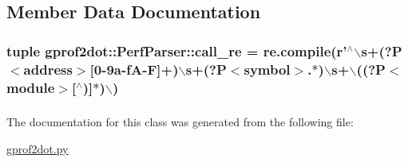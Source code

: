 \subsection{Member Data Documentation}
\hypertarget{classgprof2dot_1_1PerfParser_a4d233c4bf5eade9c8e39234afe4a0ff2}{
\subsubsection[{call\_\-re}]{\setlength{\rightskip}{0pt plus 5cm}tuple {\bf gprof2dot::PerfParser::call\_\-re} = re.compile(r'$^\wedge$$\backslash$s+(?P$<$address$>$\mbox{[}0-\/9a-\/fA-\/F\mbox{]}+)$\backslash$s+(?P$<$symbol$>$.$\ast$)$\backslash$s+$\backslash$((?P$<$module$>$\mbox{[}$^\wedge$)\mbox{]}$\ast$)$\backslash$)}}
\label{classgprof2dot_1_1PerfParser_a4d233c4bf5eade9c8e39234afe4a0ff2}
\hypertarget{classgprof2dot_1_1PerfParser_a43e50a541198b068aa4d4d2bfb5d3ea0}{
\subsubsection[{profile}]{}}
\label{classgprof2dot_1_1PerfParser_a43e50a541198b068aa4d4d2bfb5d3ea0}


The documentation for this class was generated from the following file:\begin{DoxyCompactItemize}
\item 
\hyperlink{gprof2dot_8py}{gprof2dot.py}\end{DoxyCompactItemize}

